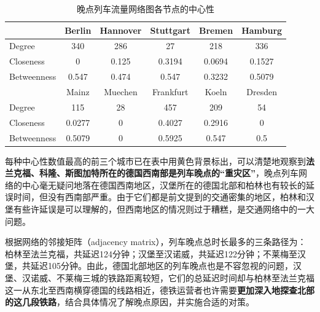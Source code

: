\documentclass[lang=cn,12pt,a4paper,cite=authoryear]{elegantpaper}
\begin{document}
\begin{table}[H]
	\centering
	\caption{晚点列车流量网络图各节点的中心性}
	\label{tab4}
	\begin{tabular}{l|ccccc}
		\hline
		& Berlin                        & Hannover & Stuttgart                      & Bremen                         & Hamburg                     \\ \hline
		Degree      & \cellcolor[HTML]{FFFFC7}340   & 286      & 27                             & 218                            & \cellcolor[HTML]{FFFFC7}336 \\
		Closeness   & 0                             & 0.125    & \cellcolor[HTML]{FFFFC7}0.3194 & 0.0694                         & 0.1527                      \\
		Betweenness & \cellcolor[HTML]{FFFFC7}0.547 & 0.474    & \cellcolor[HTML]{FFFFC7}0.547  & 0.3232                         & 0.5079                      \\ \hline
		& Mainz                         & Muechen  & Frankfurt                      & Koeln                          & Dresden                     \\ \hline
		Degree      & 115                           & 28       & \cellcolor[HTML]{FFFFC7}457    & 209                            & 54                          \\
		Closeness   & 0.0277                        & 0        & \cellcolor[HTML]{FFFFC7}0.4027 & \cellcolor[HTML]{FFFFC7}0.2916 & 0                           \\
		Betweenness & 0.5079                        & 0        & \cellcolor[HTML]{FFFFC7}0.5925 & \cellcolor[HTML]{FFFFC7}0.547  & 0.5                        
	\end{tabular}
\end{table}

每种中心性数值最高的前三个城市已在表中用黄色背景标出，可以清楚地观察到\textbf{法兰克福、科隆、斯图加特所在的德国西南部是列车晚点的“重灾区”}，晚点列车网络的中心毫无疑问地落在德国西南地区，汉堡所在的德国北部和柏林也有较长的延误时间，但没有西南部严重。由于它们都是前文提到的交通密集的地区，柏林和汉堡有些许延误是可以理解的，但西南地区的情况则过于糟糕，是交通网络中的一大问题。

根据网络的邻接矩阵（adjacency matrix），列车晚点总时长最多的三条路径为：柏林至法兰克福，共延迟124分钟；汉堡至汉诺威，共延迟122分钟；不莱梅至汉堡，共延迟105分钟。由此，德国北部地区的列车晚点也是不容忽视的问题，汉堡、汉诺威、不莱梅三城的铁路距离较短，它们的总延迟时间却与柏林至法兰克福这一从东北至西南横穿德国的线路相近，德铁运营者也许需要\textbf{更加深入地探查北部的这几段铁路}，结合具体情况了解晚点原因，并实施合适的对策。
\end{document}
